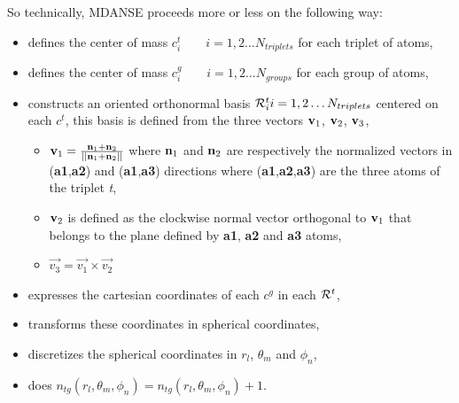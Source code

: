 \documentclass[a4paper,11pt]{article}
\begin{document}
So technically, \gls{MDANSE} proceeds more or less on the following way:
\begin{itemize}
\item defines the center of mass $c^t_i \qquad i = 1, 2 \ldots N_{triplets}$ for each triplet of atoms,
\item defines the center of mass $c^g_i \qquad i = 1, 2 \ldots N_{groups}$ for each group of atoms,
\item constructs an oriented orthonormal basis ${\cal R}^t_i i = 1, 2 \ldots N_{triplets}$ centered on each $c^t$, this
basis is defined from the three vectors ${\bf v}_1$, ${\bf v}_2$, ${\bf v}_3$,
\begin{itemize}
\item ${\bf v}_1 = \frac{{\bf n}_{1} + {\bf n}_{2}}{||{\bf n}_{1} + {\bf n}_{2}||}$
where ${\bf n}_{1}$ and ${\bf n}_{2}$ are respectively the normalized vectors in (\textbf{a1},\textbf{a2})
and (\textbf{a1},\textbf{a3}) directions where (\textbf{a1},\textbf{a2},\textbf{a3}) are the three atoms of the triplet \textit{t},
\item ${\bf v}_2$ is defined as the clockwise normal vector orthogonal to ${\bf v}_1$ that belongs to the plane
defined by \textbf{a1}, \textbf{a2} and \textbf{a3} atoms,
\item $\vec{v_3} = \vec{v_1} \times \vec{v_2}$
\end{itemize}
\item expresses the cartesian coordinates of each $c^g$ in each ${\cal R}^t$,
\item transforms these coordinates in spherical coordinates,
\item discretizes the spherical coordinates in $r_l$, $\theta_m$ and $\phi_n$,
\item does $n_{tg}(r_l,\theta_m,\phi_n) = n_{tg}(r_l,\theta_m,\phi_n) + 1$.
\end{itemize}
\end{document}
